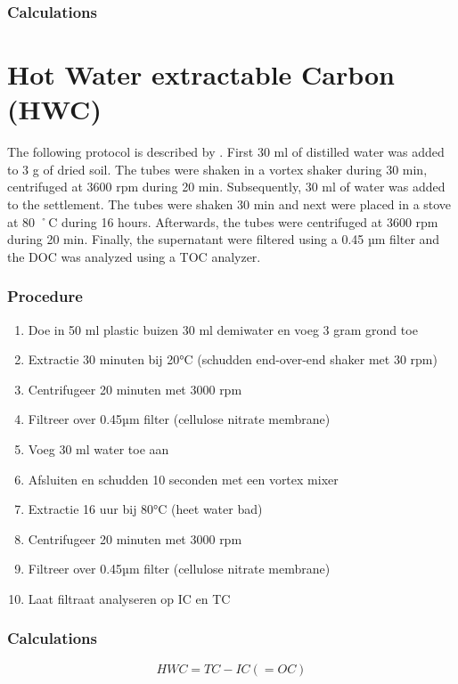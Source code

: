 \documentclass[10pt,twoside,dutch,english]{report}
\begin{document}
\begin{appendices}
\subsubsection{Calculations}

\section{Hot Water extractable Carbon (HWC)}
The following protocol is described by \citet{Ghani2003}. First 30 ml of distilled water was added to  3 g of dried soil. The tubes were shaken in a vortex shaker during 30 min, centrifuged at 3600 rpm during 20 min. Subsequently, 30 ml of water was added to the settlement. The tubes were shaken 30 min and next were placed in a stove at 80 ˚C during 16 hours. Afterwards, the tubes were centrifuged at 3600 rpm during 20 min. Finally, the supernatant were filtered using a 0.45 µm filter and the DOC was analyzed using a TOC analyzer. 
\subsubsection{Procedure}
\begin{enumerate}
\item Doe in 50 ml plastic buizen 30 ml demiwater en voeg 3 gram grond toe
\item Extractie 30 minuten bij 20°C (schudden end-over-end shaker met 30 rpm)
\item Centrifugeer 20 minuten met 3000 rpm
\item Filtreer over 0.45µm filter (cellulose nitrate membrane)
\item Voeg 30 ml water toe aan
\item Afsluiten en schudden 10 seconden met een vortex mixer
\item Extractie 16 uur bij 80°C (heet water bad)
\item Centrifugeer 20 minuten met 3000 rpm
\item Filtreer over 0.45µm filter (cellulose nitrate membrane)
\item Laat filtraat analyseren op IC en TC
\end{enumerate}



\subsubsection{Calculations}
\begin{equation} HWC= TC-IC (=OC)
\end{equation}

\end{appendices}
\end{document}
